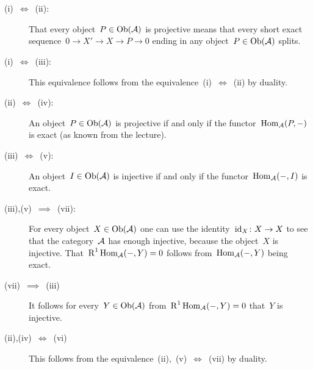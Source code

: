 \section{}


\begin{description}
  \item[(i)~$\iff$~(ii):]
    That every object~$P \in \operatorname{Ob}(\mathcal{A})$ is projective means that every short exact sequence~$0 \to X' \to X \to P \to 0$ ending in any object~$P \in \operatorname{Ob}(\mathcal{A})$ splits.
  \item[(i)~$\iff$~(iii):]
    This equivalence follows from the equivalence~(i)~$\iff$~(ii) by duality.
  \item[(ii)~$\iff$~(iv):]
    An object~$P \in \operatorname{Ob}(\mathcal{A})$ is projective if and only if the functor~$\operatorname{Hom}_{\mathcal{A}}(P,-)$ is exact (as known from the lecture).
  \item[(iii)~$\iff$~(v):]
    An object~$I \in \operatorname{Ob}(\mathcal{A})$ is injective if and only if the functor~$\operatorname{Hom}_{\mathcal{A}}(-,I)$ is exact.
  \item[(iii),(v)~$\implies$~(vii):]
    For every object~$X \in \operatorname{Ob}(\mathcal{A})$ one can use the identity~$\operatorname{id}_{X} \colon X \to X$ to see that the category~$\mathcal{A}$ has enough injective, because the object~$X$ is injective.
    That~$\operatorname{R}^1 \operatorname{Hom}_{\mathcal{A}}(-,Y) = 0$ follows from~$\operatorname{Hom}_{\mathcal{A}}(-,Y)$ being exact.
  \item[(vii)~$\implies$~(iii)]
    It follows for every~$Y \in \operatorname{Ob}(\mathcal{A})$ from~$\operatorname{R}^1 \operatorname{Hom}_{\mathcal{A}}(-,Y) = 0$ that~$Y$ is injective.
  \item[(ii),(iv)~$\iff$~(vi)]
    This follows from the equivalence~(ii),~(v)~$\iff$~(vii) by duality.
\end{description}
